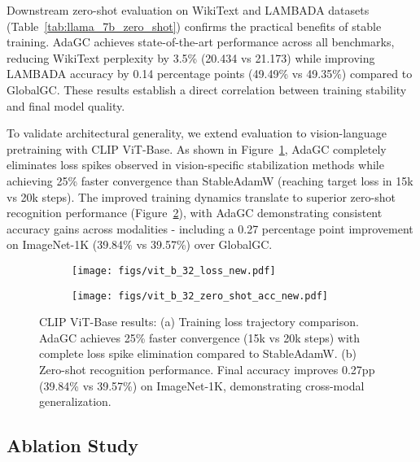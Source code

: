 Downstream zero-shot evaluation on WikiText and LAMBADA datasets (Table~\ref{tab:llama_7b_zero_shot}) confirms the practical benefits of stable training. AdaGC achieves state-of-the-art performance across all benchmarks, reducing WikiText perplexity by 3.5\% (20.434 vs 21.173) while improving LAMBADA accuracy by 0.14 percentage points (49.49\% vs 49.35\%) compared to GlobalGC. These results establish a direct correlation between training stability and final model quality.

To validate architectural generality, we extend evaluation to vision-language pretraining with CLIP ViT-Base. As shown in Figure~\ref{fig:openclip_vit_b_32_a}, AdaGC completely eliminates loss spikes observed in vision-specific stabilization methods while achieving 25\% faster convergence than StableAdamW (reaching target loss in 15k vs 20k steps). The improved training dynamics translate to superior zero-shot recognition performance (Figure~\ref{fig:openclip_vit_b_32_b}), with AdaGC demonstrating consistent accuracy gains across modalities - including a 0.27 percentage point improvement on ImageNet-1K (39.84\% vs 39.57\%) over GlobalGC.


\begin{figure}[!t]
    \vskip 0.1in
    \centering
    \begin{subfigure}{0.495\columnwidth}
        \texttt{[image: figs/vit\_b\_32\_loss\_new.pdf]}
        \caption{}
        \label{fig:openclip_vit_b_32_a}
    \end{subfigure} \hfill
    \begin{subfigure}{0.495\columnwidth}
        \texttt{[image: figs/vit\_b\_32\_zero\_shot\_acc\_new.pdf]}
        \caption{}
        \label{fig:openclip_vit_b_32_b}
    \end{subfigure}
    \caption{CLIP ViT-Base results: (a) Training loss trajectory comparison. AdaGC achieves 25\% faster convergence (15k vs 20k steps) with complete loss spike elimination compared to StableAdamW. (b) Zero-shot recognition performance. Final accuracy improves 0.27pp (39.84\% vs 39.57\%) on ImageNet-1K, demonstrating cross-modal generalization.}
    \label{fig:openclip_vit_b_32}
    \vskip -0.2in
\end{figure}

\subsection{Ablation Study}
\label{sec:ablation}

